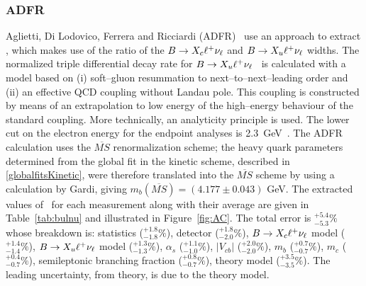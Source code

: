 \subsubsection{ADFR}
Aglietti, Di Lodovico, Ferrera and Ricciardi (ADFR)~\cite{Aglietti:2007ik}
use an approach to extract \vub, which makes use of the ratio
of the  $B \to X_c \ell^+ \nu_\ell$ and $B \to X_u \ell^+ \nu_\ell$ widths. 
The normalized triple differential decay rate for 
$B \to X_u \ell^+ \nu_\ell$~\cite{Aglietti:2006yb,Aglietti:2005mb, Aglietti:2005bm, Aglietti:2005eq}
is calculated with a model based on (i) soft--gluon resummation 
to next--to--next--leading order and (ii) an effective QCD coupling without
Landau pole. This coupling is constructed by means of an extrapolation to low
energy of the high--energy behaviour of the standard coupling. More technically,
an analyticity principle is used.
The lower cut on the electron energy for the endpoint analyses is 2.3~GeV~\cite{Aglietti:2006yb}.
The ADFR calculation uses the $\overline{MS}$ renormalization scheme; the heavy quark parameters determined  
from the global fit in the kinetic scheme, described in \ref{globalfitsKinetic}, were therefore 
translated into the $\overline{MS}$ scheme by using a calculation by Gardi, giving 
$m_b({\overline{MS}})=(4.177 \pm 0.043)$ GeV.
The extracted values
of \vub\, for each measurement along with their average are given in
Table~\ref{tab:bulnu} and illustrated in Figure~\ref{fig:AC}.
The total error is $^{+5.4}_{-5.3}\%$ whose breakdown is:
statistics ($^{+1.8}_{-1.8}\%$),
detector ($^{+1.8}_{-2.0}\%$),
$B\to X_c \ell^+ \nu_\ell$ model ($^{+1.4}_{-1.4}\%$),
$B\to X_u \ell^+ \nu_\ell$ model ($^{+1.3}_{-1.3}\%$),
$\alpha_s$ ($^{+1.1}_{-1.0}\%$), 
$|V_{cb}|$ ($^{+2.0}_{-2.0}\%$), 
$m_b$ ($^{+0.7}_{-0.7}\%$), 
$m_c$ ($^{+0.4}_{-0.7}\%$), 
semileptonic branching fraction ($^{+0.8}_{-0.7}\%$), 
theory model ($^{+3.5}_{-3.5}\%$).
The leading
uncertainty, from theory, is due to the theory model.

